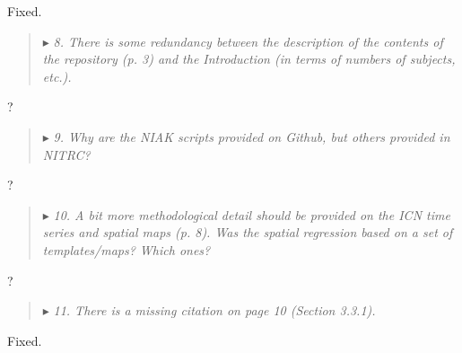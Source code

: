 \documentclass[authoryear,3p]{elsarticle}
\begin{document}
Fixed.

\begin{quote}
$\blacktriangleright$\emph{ 
8. There is some redundancy between the description of the contents of the repository (p. 3) and the Introduction (in terms of numbers of subjects, etc.).
}
\end{quote}

?

\begin{quote}
$\blacktriangleright$\emph{ 
9. Why are the NIAK scripts provided on Github, but others provided in NITRC?}
\end{quote}

?

\begin{quote}
$\blacktriangleright$\emph{ 
10. A bit more methodological detail should be provided on the ICN time series and spatial maps (p. 8).  Was the spatial regression based on a set of templates/maps?  Which ones?}
\end{quote}

?

\begin{quote}
$\blacktriangleright$\emph{ 
11. There is a missing citation on page 10 (Section 3.3.1).
}
\end{quote}

Fixed.
\end{document}
